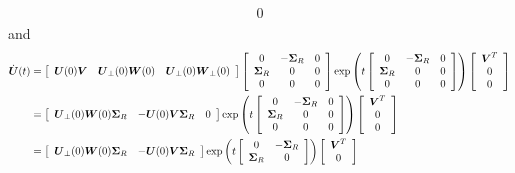 \documentclass[11pt]{article}
\begin{document}
\begin{enumerate}
\begin{align*}
{\begin{array}{c}
0 
\end{array} }  
\end{align*}
and
\begin{align*}
\dot{\mb{U}}(t) &=\brac{\begin{array}{ccc}
\mb{U}(0)\mb{V} & \mb{U}_{\bot}(0) \mb{W}(0) & \mb{U}_{\bot}(0) \mb{W}_{\bot}(0)
\end{array}}\brac{\begin{array}{ccc}
0 & -\mb{\Sigma}_{R} & 0 \\ 
\mb{\Sigma}_{R}& 0 & 0 \\ 
0 & 0 & 0
\end{array} }\exp\paren{t \brac{\begin{array}{ccc}
0 & -\mb{\Sigma}_{R} & 0 \\ 
\mb{\Sigma}_{R}& 0 & 0 \\ 
0 & 0 & 0
\end{array} }}\brac{\begin{array}{c}
\mb{V}^{T} \\
 0\\ 
0 
\end{array} } \\
&=    \brac{\begin{array}{ccc}
\mb{U}_{\bot}(0) \mb{W}(0)\mb{\Sigma}_{R} & - \mb{U}(0)\mb{V}\mb{\Sigma}_{R}  & 0
\end{array}}\exp\paren{t \brac{\begin{array}{ccc}
0 & -\mb{\Sigma}_{R} & 0 \\ 
\mb{\Sigma}_{R}& 0 & 0 \\ 
0 & 0 & 0
\end{array} }}\brac{\begin{array}{c}
\mb{V}^{T} \\
 0\\ 
0 
\end{array} }\\
&=  \brac{\begin{array}{cc}
\mb{U}_{\bot}(0) \mb{W}(0)\mb{\Sigma}_{R} & - \mb{U}(0)\mb{V}\mb{\Sigma}_{R} 
\end{array}}\exp\paren{t \brac{\begin{array}{cc}
0 & -\mb{\Sigma}_{R} \\ 
\mb{\Sigma}_{R}& 0  \\ 
\end{array} }}\brac{\begin{array}{c}
\mb{V}^{T} \\
 0\\ 
\end{array} }

\end{align*}
\end{enumerate}
\end{document}

